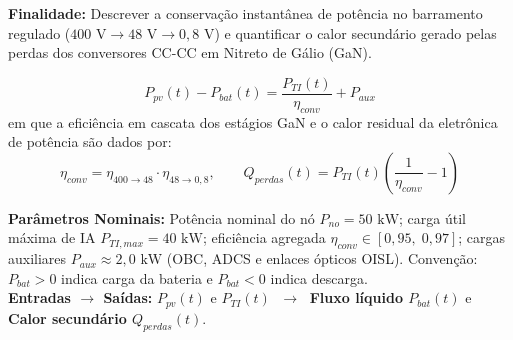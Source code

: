 \documentclass[11pt,a4paper]{article}
\begin{document}
\begin{tcolorbox}[colback=boxbg, colframe=bordergreen, title=\color{ifesdark}\textbf{MODELO 2: BALANÇO DE POTÊNCIA NO BARRAMENTO HVDC (50 kW) E PERDAS GaN}]
\small
\textbf{Finalidade:} Descrever a conservação instantânea de potência no barramento regulado ($400\text{ V} \to 48\text{ V} \to 0{,}8\text{ V}$) e quantificar o calor secundário gerado pelas perdas dos conversores CC-CC em Nitreto de Gálio (GaN).

\vspace{-4pt}
\begin{equation}
    P_{pv}(t) - P_{bat}(t) = \frac{P_{TI}(t)}{\eta_{conv}} + P_{aux}
    \label{eq:balanco_hvdc}
\end{equation}
em que a eficiência em cascata dos estágios GaN e o calor residual da eletrônica de potência são dados por:
\begin{equation}
    \eta_{conv} = \eta_{400\to 48} \cdot \eta_{48\to 0{,}8}, \qquad
    Q_{perdas}(t) = P_{TI}(t) \left( \frac{1}{\eta_{conv}} - 1 \right)
    \label{eq:perdas_gan}
\end{equation}

\vspace{2pt}
\noindent\textbf{Parâmetros Nominais:} Potência nominal do nó $P_{no} = 50\text{ kW}$; carga útil máxima de IA $P_{TI,max} = 40\text{ kW}$; eficiência agregada $\eta_{conv} \in [0{,}95,\; 0{,}97]$; cargas auxiliares $P_{aux} \approx 2{,}0\text{ kW}$ (OBC, ADCS e enlaces ópticos OISL). Convenção: $P_{bat} > 0$ indica carga da bateria e $P_{bat} < 0$ indica descarga.\\
\textbf{Entradas $\to$ Saídas:} $P_{pv}(t)$ e $P_{TI}(t)$ $\;\longrightarrow\;$ \textbf{Fluxo líquido $P_{bat}(t)$} e \textbf{Calor secundário $Q_{perdas}(t)$}.
\end{tcolorbox}

\vspace{4pt}
\end{document}
